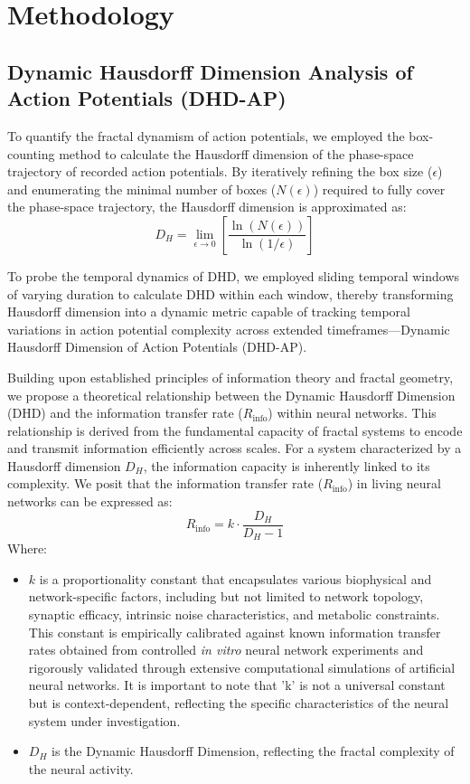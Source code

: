 \documentclass{article}
\begin{document}
\section{Methodology}

\subsection{Dynamic Hausdorff Dimension Analysis of Action Potentials (DHD-AP)}

To quantify the fractal dynamism of action potentials, we employed the box-counting method to calculate the Hausdorff dimension of the phase-space trajectory of recorded action potentials. By iteratively refining the box size ($\epsilon$) and enumerating the minimal number of boxes ($N(\epsilon)$) required to fully cover the phase-space trajectory, the Hausdorff dimension is approximated as:
\begin{equation}
D_H = \lim_{\epsilon \to 0} \left[ \frac{\ln(N(\epsilon))}{\ln(1/\epsilon)} \right]
\end{equation}

To probe the temporal dynamics of DHD, we employed sliding temporal windows of varying duration to calculate DHD within each window, thereby transforming Hausdorff dimension into a dynamic metric capable of tracking temporal variations in action potential complexity across extended timeframes—Dynamic Hausdorff Dimension of Action Potentials (DHD-AP).

Building upon established principles of information theory and fractal geometry, we propose a theoretical relationship between the Dynamic Hausdorff Dimension (DHD) and the information transfer rate ($R_\text{info}$) within neural networks. This relationship is derived from the fundamental capacity of fractal systems to encode and transmit information efficiently across scales. For a system characterized by a Hausdorff dimension $D_H$, the information capacity is inherently linked to its complexity. We posit that the information transfer rate ($R_\text{info}$) in living neural networks can be expressed as:
\begin{equation}
R_\text{info} = k \cdot \frac{D_H}{D_H - 1}
\end{equation}
Where:
\begin{itemize}
    \item $k$ is a proportionality constant that encapsulates various biophysical and network-specific factors, including but not limited to network topology, synaptic efficacy, intrinsic noise characteristics, and metabolic constraints. This constant is empirically calibrated against known information transfer rates obtained from controlled \textit{in vitro} neural network experiments and rigorously validated through extensive computational simulations of artificial neural networks. It is important to note that 'k' is not a universal constant but is context-dependent, reflecting the specific characteristics of the neural system under investigation.
    \item $D_H$ is the Dynamic Hausdorff Dimension, reflecting the fractal complexity of the neural activity.
\end{itemize}
\end{document}
